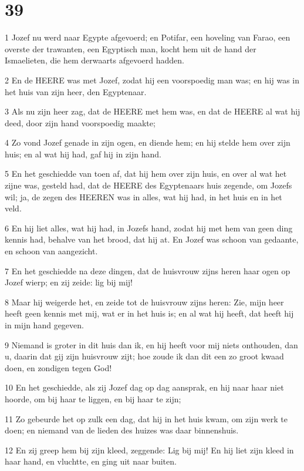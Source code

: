 \chapter{39}

\par 1 Jozef nu werd naar Egypte afgevoerd; en Potifar, een hoveling van Farao, een overste der trawanten, een Egyptisch man, kocht hem uit de hand der Ismaelieten, die hem derwaarts afgevoerd hadden.
\par 2 En de HEERE was met Jozef, zodat hij een voorspoedig man was; en hij was in het huis van zijn heer, den Egyptenaar.
\par 3 Als nu zijn heer zag, dat de HEERE met hem was, en dat de HEERE al wat hij deed, door zijn hand voorspoedig maakte;
\par 4 Zo vond Jozef genade in zijn ogen, en diende hem; en hij stelde hem over zijn huis; en al wat hij had, gaf hij in zijn hand.
\par 5 En het geschiedde van toen af, dat hij hem over zijn huis, en over al wat het zijne was, gesteld had, dat de HEERE des Egyptenaars huis zegende, om Jozefs wil; ja, de zegen des HEEREN was in alles, wat hij had, in het huis en in het veld.
\par 6 En hij liet alles, wat hij had, in Jozefs hand, zodat hij met hem van geen ding kennis had, behalve van het brood, dat hij at. En Jozef was schoon van gedaante, en schoon van aangezicht.
\par 7 En het geschiedde na deze dingen, dat de huisvrouw zijns heren haar ogen op Jozef wierp; en zij zeide: lig bij mij!
\par 8 Maar hij weigerde het, en zeide tot de huisvrouw zijns heren: Zie, mijn heer heeft geen kennis met mij, wat er in het huis is; en al wat hij heeft, dat heeft hij in mijn hand gegeven.
\par 9 Niemand is groter in dit huis dan ik, en hij heeft voor mij niets onthouden, dan u, daarin dat gij zijn huisvrouw zijt; hoe zoude ik dan dit een zo groot kwaad doen, en zondigen tegen God!
\par 10 En het geschiedde, als zij Jozef dag op dag aansprak, en hij naar haar niet hoorde, om bij haar te liggen, en bij haar te zijn;
\par 11 Zo gebeurde het op zulk een dag, dat hij in het huis kwam, om zijn werk te doen; en niemand van de lieden des huizes was daar binnenshuis.
\par 12 En zij greep hem bij zijn kleed, zeggende: Lig bij mij! En hij liet zijn kleed in haar hand, en vluchtte, en ging uit naar buiten.
